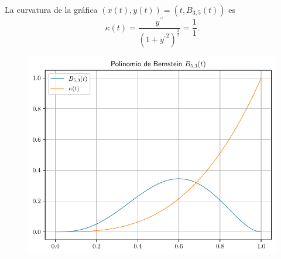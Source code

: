 \begin{frame}
\begin{solution}
        La curvatura de la gráfica
        \begin{math}
            \left(
            x\left(t\right),
            y\left(t\right)
            \right)=
            \left(
            t,
            B_{3,5}\left(t\right)
            \right)
        \end{math}
        es
        \begin{equation*}
            \kappa\left(t\right)=
            \dfrac{
                y^{\prime\prime}
            }{
                {\left(1+{y^{\prime}}^{2}\right)}^{\frac{3}{2}}
            }=
            \dfrac{1}{1}.
        \end{equation*}
    \end{solution}
\end{frame}

\begin{frame}
    \begin{solution}
        \begin{figure}[ht!]
            \centering
            \includegraphics[width=.72\paperwidth]{p1}
        \end{figure}
    \end{solution}
\end{frame}
